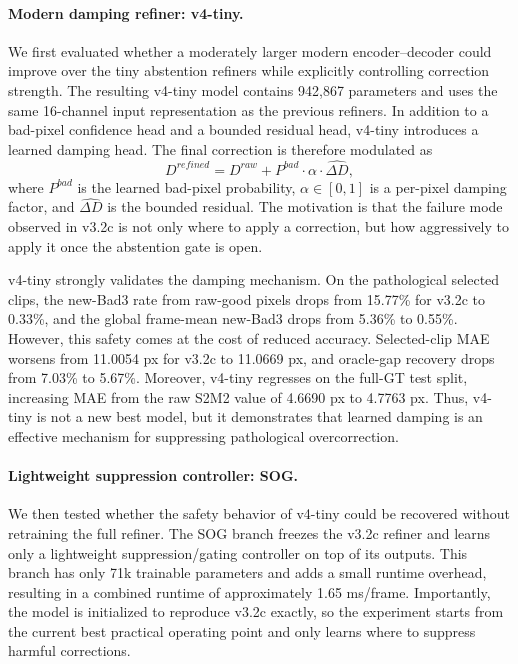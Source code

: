 \documentclass[11pt,a4paper]{article}
\begin{document}
\paragraph{Modern damping refiner: v4-tiny.}
We first evaluated whether a moderately larger modern encoder--decoder could
improve over the tiny abstention refiners while explicitly controlling correction
strength. The resulting v4-tiny model contains 942,867 parameters and uses the
same 16-channel input representation as the previous refiners. In addition to a
bad-pixel confidence head and a bounded residual head, v4-tiny introduces a
learned damping head. The final correction is therefore modulated as
\[
D^{refined} = D^{raw} + P^{bad} \cdot \alpha \cdot \widehat{\Delta D},
\]
where \(P^{bad}\) is the learned bad-pixel probability, \(\alpha \in [0,1]\) is
a per-pixel damping factor, and \(\widehat{\Delta D}\) is the bounded residual.
The motivation is that the failure mode observed in v3.2c is not only where to
apply a correction, but how aggressively to apply it once the abstention gate is
open.

v4-tiny strongly validates the damping mechanism. On the pathological selected
clips, the new-Bad3 rate from raw-good pixels drops from 15.77\% for v3.2c to
0.33\%, and the global frame-mean new-Bad3 drops from 5.36\% to 0.55\%. However,
this safety comes at the cost of reduced accuracy. Selected-clip MAE worsens from
11.0054 px for v3.2c to 11.0669 px, and oracle-gap recovery drops from 7.03\% to
5.67\%. Moreover, v4-tiny regresses on the full-GT test split, increasing MAE
from the raw S2M2 value of 4.6690 px to 4.7763 px. Thus, v4-tiny is not a new
best model, but it demonstrates that learned damping is an effective mechanism
for suppressing pathological overcorrection.
\paragraph{Lightweight suppression controller: SOG.}
We then tested whether the safety behavior of v4-tiny could be recovered without
retraining the full refiner. The SOG branch freezes the v3.2c refiner and learns
only a lightweight suppression/gating controller on top of its outputs. This
branch has only 71k trainable parameters and adds a small runtime overhead,
resulting in a combined runtime of approximately 1.65 ms/frame. Importantly, the
model is initialized to reproduce v3.2c exactly, so the experiment starts from
the current best practical operating point and only learns where to suppress
harmful corrections.
\end{document}
